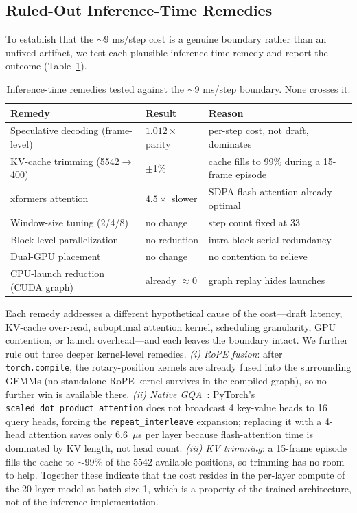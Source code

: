 \documentclass[10pt, twocolumn]{article}
\begin{document}
\subsection{Ruled-Out Inference-Time Remedies}
\label{sec:remedies}

To establish that the $\sim$9 ms/step cost is a genuine boundary rather than an unfixed artifact, we test each plausible inference-time remedy and report the outcome (Table~\ref{tab:remedies}).

\begin{table}[t]
  \centering
  \small
  \caption{Inference-time remedies tested against the $\sim$9 ms/step boundary. None crosses it.}
  \label{tab:remedies}
  \begin{tabular}{lll}
    \toprule
    Remedy & Result & Reason \\
    \midrule
    Speculative decoding (frame-level) & $1.012\times$ parity & per-step cost, not draft, dominates \\
    KV-cache trimming (5542$\to$400) & $\pm$1\% & cache fills to 99\% during a 15-frame episode \\
    xformers attention & $4.5\times$ slower & SDPA flash attention already optimal \\
    Window-size tuning (2/4/8) & no change & step count fixed at 33 \\
    Block-level parallelization & no reduction & intra-block serial redundancy \\
    Dual-GPU placement & no change & no contention to relieve \\
    CPU-launch reduction (CUDA graph) & already $\approx$0 & graph replay hides launches \\
    \bottomrule
  \end{tabular}
\end{table}

Each remedy addresses a different hypothetical cause of the cost---draft latency, KV-cache over-read, suboptimal attention kernel, scheduling granularity, GPU contention, or launch overhead---and each leaves the boundary intact. We further rule out three deeper kernel-level remedies. \emph{(i) RoPE fusion}: after \texttt{torch.compile}, the rotary-position kernels are already fused into the surrounding GEMMs (no standalone RoPE kernel survives in the compiled graph), so no further win is available there. \emph{(ii) Native GQA}~\cite{gqa}: PyTorch's \texttt{scaled\_dot\_product\_attention} does not broadcast 4 key-value heads to 16 query heads, forcing the \texttt{repeat\_interleave} expansion; replacing it with a 4-head attention saves only $6.6$~$\mu$s per layer because flash-attention time is dominated by KV length, not head count. \emph{(iii) KV trimming}: a 15-frame episode fills the cache to $\sim$99\% of the 5542 available positions, so trimming has no room to help. Together these indicate that the cost resides in the per-layer compute of the 20-layer model at batch size 1, which is a property of the trained architecture, not of the inference implementation.
\end{document}
